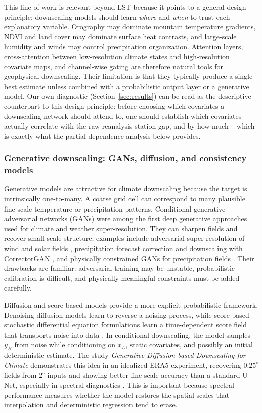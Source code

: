 \documentclass[a4paper,12pt,leqno]{article}
\begin{document}
This line of work is relevant beyond LST because it points to a general
design principle: downscaling models should learn \emph{where} and
\emph{when} to trust each explanatory variable. Orography may dominate
mountain temperature gradients, NDVI and land cover may dominate surface
heat contrasts, and large-scale humidity and winds may control
precipitation organization. Attention layers, cross-attention between
low-resolution climate states and high-resolution covariate maps, and
channel-wise gating are therefore natural tools for geophysical
downscaling. Their limitation is that they typically produce a single
best estimate unless combined with a probabilistic output layer or a
generative model. Our own diagnostic (Section~\ref{sec:results}) can be
read as the descriptive counterpart to this design principle: before
choosing which covariates a downscaling network should attend to, one
should establish which covariates actually correlate with the raw
reanalysis-station gap, and by how much -- which is exactly what the
partial-dependence analysis below provides.

\subsubsection{Generative downscaling: GANs, diffusion, and consistency
models}

Generative models are attractive for climate downscaling because the
target is intrinsically one-to-many. A coarse grid cell can correspond to
many plausible fine-scale temperature or precipitation patterns.
Conditional generative adversarial networks (GANs) were among the first
deep generative approaches used for climate and weather super-resolution.
They can sharpen fields and recover small-scale structure; examples
include adversarial super-resolution of wind and solar fields
\parencite{stengel2020adversarial_super_resolution}, precipitation
forecast correction and downscaling with CorrectorGAN
\parencite{price2022correctorgan}, and physically constrained GANs for
precipitation fields \parencite{hess2022physically_constrained_gan}. Their
drawbacks are familiar: adversarial training may be unstable,
probabilistic calibration is difficult, and physically meaningful
constraints must be added carefully.

Diffusion and score-based models provide a more explicit probabilistic
framework. Denoising diffusion models learn to reverse a noising process,
while score-based stochastic differential equation formulations learn a
time-dependent score field that transports noise into data
\parencite{ho2020ddpm,song2021score_sde}. In conditional downscaling, the
model samples \(y_H\) from noise while conditioning on \(x_L\), static
covariates, and possibly an initial deterministic estimate. The study
\emph{Generative Diffusion-based Downscaling for Climate} demonstrates
this idea in an idealized ERA5 experiment, recovering \(0.25^\circ\)
fields from \(2^\circ\) inputs and showing better fine-scale accuracy
than a standard U-Net, especially in spectral diagnostics
\parencite{watt2024diffusion_downscaling}. This is important because
spectral performance measures whether the model restores the spatial
scales that interpolation and deterministic regression tend to erase.
\end{document}
